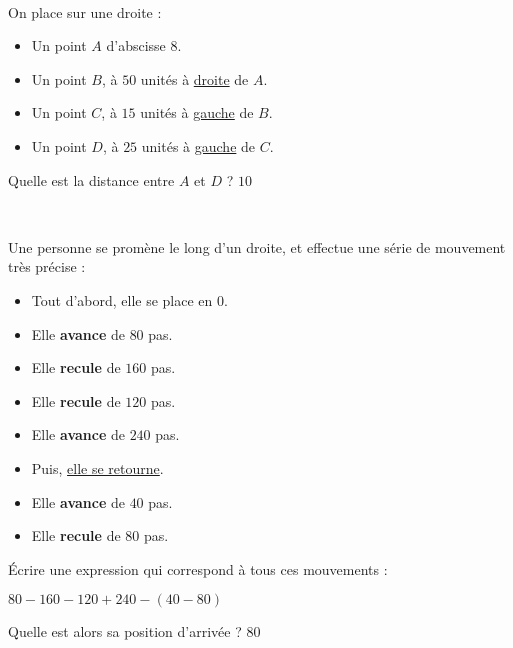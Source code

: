 \documentclass[a4paper,12pt]{article}
\newcommand{\correction}[1]{{\color{red}#1}}
\newcommand{\exerciceEspacement}{0.6em}
\begin{document}
\vspace{\exerciceEspacement}

\begin{exercice}\

	On place sur une droite :
	\begin{itemize}
		\item Un point $A$ d'abscisse $8$.
		\item Un point $B$, à $50$ unités à \uline{droite} de $A$.
		\item Un point $C$, à $15$ unités à \uline{gauche} de $B$.
		\item Un point $D$, à $25$ unités à \uline{gauche} de $C$.
	\end{itemize}


	Quelle est la distance entre $A$ et $D$ ? \correction{$10$}
\end{exercice}

\vspace{\exerciceEspacement}

\begin{exercice}\

	Une personne se promène le long d'un droite, et effectue une série de mouvement très précise :

	\begin{itemize}
		\item Tout d'abord, elle se place en $0$.
		\item Elle \textbf{avance} de $80$ pas.
		\item Elle \textbf{recule} de $160$ pas.
		\item Elle \textbf{recule} de $120$ pas.
		\item Elle \textbf{avance} de $240$ pas.
		\item Puis, \uline{elle se retourne}.
		\item Elle \textbf{avance} de $40$ pas.
		\item Elle \textbf{recule} de $80$ pas.
	\end{itemize}

	Écrire une expression qui correspond à tous ces mouvements :
	\vspace{0.4em}
	\begin{center}
		\correction{$80 - 160 - 120 + 240 - (40 - 80)$}
	\end{center}
	\vspace{0.4em}

	Quelle est alors sa position d'arrivée ? \correction{$80$}
\end{exercice}
\end{document}
